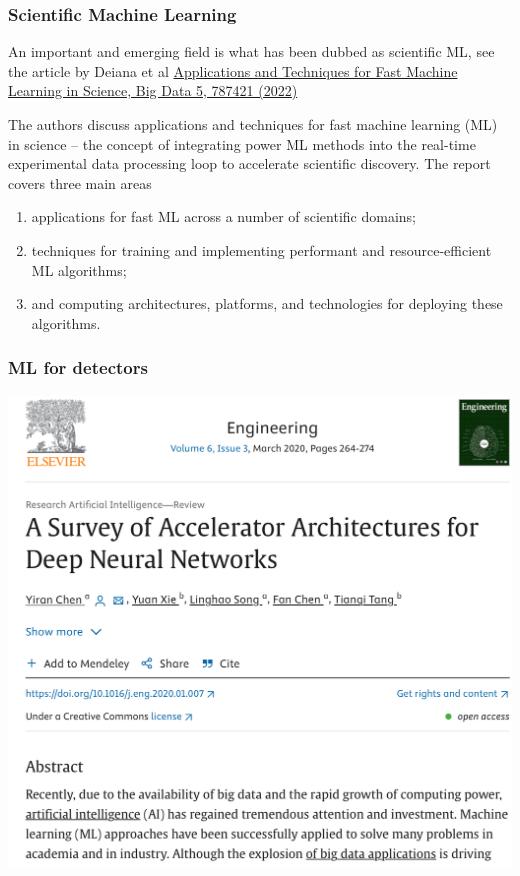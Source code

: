 \documentclass{beamer}
\begin{document}
\begin{frame}
\frametitle{Scientific Machine Learning}

An important and emerging field is what has been dubbed as scientific ML, see the article by Deiana et al \href{{https://doi.org/10.3389/fdata.2022.787421}}{Applications and Techniques for Fast Machine Learning in Science, Big Data 5, 787421 (2022)}

\begin{block}{}
The authors discuss applications and techniques for fast machine
learning (ML) in science -- the concept of integrating power ML
methods into the real-time experimental data processing loop to
accelerate scientific discovery. The report covers three main areas

\begin{enumerate}
\item applications for fast ML across a number of scientific domains;

\item techniques for training and implementing performant and resource-efficient ML algorithms;

\item and computing architectures, platforms, and technologies for deploying these algorithms.
\end{enumerate}

\noindent
\end{block}
\end{frame}

\begin{frame}
\frametitle{ML for detectors}

\vspace{6mm}

\centerline{\includegraphics[width=1.0\linewidth]{figures/detectors.png}}

\vspace{6mm}
\end{frame}
\end{document}

